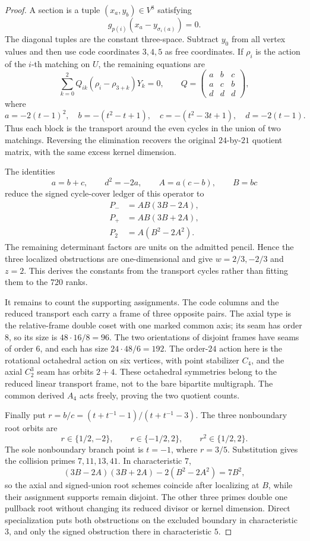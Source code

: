 \documentclass[11pt]{article}
\theoremstyle{definition}
\theoremstyle{remark}
\begin{document}
\begin{proof}
A section is a tuple \((x_a,y_b)\in V^8\) satisfying
\[
 g_{p(i)}(x_a-y_{\sigma_i(a)})=0.
\]
The diagonal tuples are the constant three-space.  Subtract \(y_0\) from
all vertex values and then use code coordinates \(3,4,5\) as free
coordinates.  If \(\rho_i\) is the action of the \(i\)-th matching on
\(U\), the remaining equations are
\[
 \sum_{k=0}^2 Q_{ik}(\rho_i-\rho_{3+k})Y_k=0,\qquad
 Q=\begin{pmatrix}a&b&c\\a&c&b\\d&d&d\end{pmatrix},
\]
where
\[
 a=-2(t-1)^2,\quad b=-(t^2-t+1),\quad
 c=-(t^2-3t+1),\quad d=-2(t-1).
\]
Thus each block is the transport around the even cycles in the union of
two matchings.  Reversing the elimination recovers the original
\(24\)-by-\(21\) quotient matrix, with the same excess kernel dimension.

The identities
\[
 a=b+c,\qquad d^2=-2a,\qquad A=a(c-b),\qquad B=bc
\]
reduce the signed cycle-cover ledger of this operator to
\[
\begin{aligned}
 P_-&=AB(3B-2A),\\
 P_+&=AB(3B+2A),\\
 P_2&=A(B^2-2A^2).
\end{aligned}
\]
The remaining determinant factors are units on the admitted pencil.
Hence the three localized obstructions are one-dimensional and give
\(w=2/3,-2/3\) and \(z=2\).  This derives the constants from the
transport cycles rather than fitting them to the \(720\) ranks.

It remains to count the supporting assignments.  The code columns and
the reduced transport each carry a frame of three opposite pairs.  The
axial type is the relative-frame double coset with one marked common
axis; its seam has order \(8\), so its size is
\(48\cdot16/8=96\).  The two orientations of disjoint frames have seams
of order \(6\), and each has size \(24\cdot48/6=192\).  The order-\(24\)
action here is the rotational octahedral action on six vertices, with
point stabilizer \(C_4\), and the axial \(C_2^3\) seam has orbits
\(2+4\).  These octahedral symmetries belong to the reduced linear
transport frame, not to the bare bipartite multigraph.  The common
derived \(A_4\) acts freely, proving the two quotient counts.

Finally put \(r=b/c=(t+t^{-1}-1)/(t+t^{-1}-3)\).  The three nonboundary
root orbits are
\[
 r\in\{1/2,-2\},\qquad r\in\{-1/2,2\},\qquad
 r^2\in\{1/2,2\}.
\]
The sole nonboundary branch point is \(t=-1\), where \(r=3/5\).
Substitution gives the collision primes \(7,11,13,41\).  In characteristic
\(7\),
\[
 (3B-2A)(3B+2A)-2(B^2-2A^2)=7B^2,
\]
so the axial and signed-union root schemes coincide after localizing at
\(B\), while their assignment supports remain disjoint.  The other
three primes double one pullback root without changing its reduced
divisor or kernel dimension.  Direct specialization puts both
obstructions on the excluded boundary in characteristic \(3\), and only
the signed obstruction there in characteristic \(5\).
\end{proof}
\end{document}
